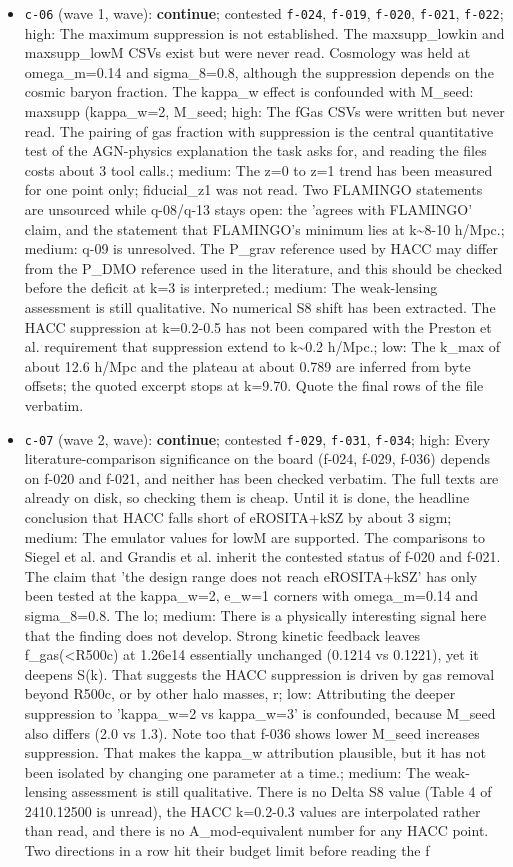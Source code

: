 \documentclass[11pt,a4paper]{article}
\begin{document}
\begin{itemize}
  \item \texttt{c-06} (wave 1, wave): \textbf{continue}; contested \texttt{f-024}, \texttt{f-019}, \texttt{f-020}, \texttt{f-021}, \texttt{f-022}; high: The maximum suppression is not established. The maxsupp\_lowkin and maxsupp\_lowM CSVs exist but were never read. Cosmology was held at omega\_m=0.14 and sigma\_8=0.8, although the suppression depends on the cosmic baryon fraction. The kappa\_w effect is confounded with M\_seed: maxsupp (kappa\_w=2, M\_seed; high: The fGas CSVs were written but never read. The pairing of gas fraction with suppression is the central quantitative test of the AGN-physics explanation the task asks for, and reading the files costs about 3 tool calls.; medium: The z=0 to z=1 trend has been measured for one point only; fiducial\_z1 was not read. Two FLAMINGO statements are unsourced while q-08/q-13 stays open: the 'agrees with FLAMINGO' claim, and the statement that FLAMINGO's minimum lies at k\textasciitilde{}8-10 h/Mpc.; medium: q-09 is unresolved. The P\_grav reference used by HACC may differ from the P\_DMO reference used in the literature, and this should be checked before the deficit at k=3 is interpreted.; medium: The weak-lensing assessment is still qualitative. No numerical S8 shift has been extracted. The HACC suppression at k=0.2-0.5 has not been compared with the Preston et al. requirement that suppression extend to k\textasciitilde{}0.2 h/Mpc.; low: The k\_max of about 12.6 h/Mpc and the plateau at about 0.789 are inferred from byte offsets; the quoted excerpt stops at k=9.70. Quote the final rows of the file verbatim.
  \item \texttt{c-07} (wave 2, wave): \textbf{continue}; contested \texttt{f-029}, \texttt{f-031}, \texttt{f-034}; high: Every literature-comparison significance on the board (f-024, f-029, f-036) depends on f-020 and f-021, and neither has been checked verbatim. The full texts are already on disk, so checking them is cheap. Until it is done, the headline conclusion that HACC falls short of eROSITA+kSZ by about 3 sigm; medium: The emulator values for lowM are supported. The comparisons to Siegel et al. and Grandis et al. inherit the contested status of f-020 and f-021. The claim that 'the design range does not reach eROSITA+kSZ' has only been tested at the kappa\_w=2, e\_w=1 corners with omega\_m=0.14 and sigma\_8=0.8. The lo; medium: There is a physically interesting signal here that the finding does not develop. Strong kinetic feedback leaves f\_gas(\textless{}R500c) at 1.26e14 essentially unchanged (0.1214 vs 0.1221), yet it deepens S(k). That suggests the HACC suppression is driven by gas removal beyond R500c, or by other halo masses, r; low: Attributing the deeper suppression to 'kappa\_w=2 vs kappa\_w=3' is confounded, because M\_seed also differs (2.0 vs 1.3). Note too that f-036 shows lower M\_seed increases suppression. That makes the kappa\_w attribution plausible, but it has not been isolated by changing one parameter at a time.; medium: The weak-lensing assessment is still qualitative. There is no Delta S8 value (Table 4 of 2410.12500 is unread), the HACC k=0.2-0.3 values are interpolated rather than read, and there is no A\_mod-equivalent number for any HACC point. Two directions in a row hit their budget limit before reading the f

\end{itemize}
\end{document}
